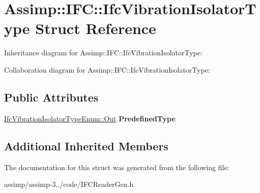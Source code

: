 \hypertarget{struct_assimp_1_1_i_f_c_1_1_ifc_vibration_isolator_type}{\section{Assimp\+:\+:I\+F\+C\+:\+:Ifc\+Vibration\+Isolator\+Type Struct Reference}
\label{struct_assimp_1_1_i_f_c_1_1_ifc_vibration_isolator_type}
}


Inheritance diagram for Assimp\+:\+:I\+F\+C\+:\+:Ifc\+Vibration\+Isolator\+Type\+:


Collaboration diagram for Assimp\+:\+:I\+F\+C\+:\+:Ifc\+Vibration\+Isolator\+Type\+:
\subsection*{Public Attributes}
\begin{DoxyCompactItemize}
\item 
\hypertarget{struct_assimp_1_1_i_f_c_1_1_ifc_vibration_isolator_type_ac16ed25a5f359210b4c8dbbe498c3ff9}{\hyperlink{classboost_1_1shared__ptr}{Ifc\+Vibration\+Isolator\+Type\+Enum\+::\+Out} {\bfseries Predefined\+Type}}\label{struct_assimp_1_1_i_f_c_1_1_ifc_vibration_isolator_type_ac16ed25a5f359210b4c8dbbe498c3ff9}

\end{DoxyCompactItemize}
\subsection*{Additional Inherited Members}


The documentation for this struct was generated from the following file\+:\begin{DoxyCompactItemize}
\item 
assimp/assimp-\/3../code/I\+F\+C\+Reader\+Gen.\+h\end{DoxyCompactItemize}
